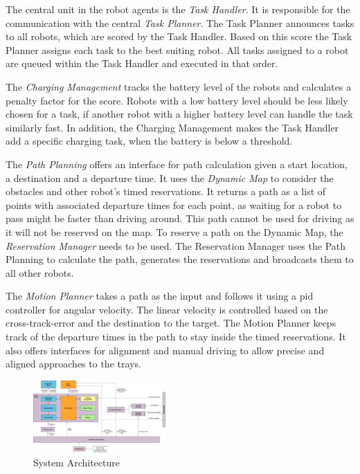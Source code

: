 \documentclass[journal]{IEEEtran}
\begin{document}
The central unit in the robot agents is the \emph{Task Handler}. It is responsible for the communication with the central \emph{Task Planner}. The Task Planner announces tasks to all robots, which are scored by the Task Handler. Based on this score the Task Planner assigns each task to the best suiting robot. All tasks assigned to a robot are queued within the Task Handler and executed in that order.

The \emph{Charging Management} tracks the battery level of the robots and calculates a penalty factor for the score. Robots with a low battery level should be less likely chosen for a task, if another robot with a higher battery level can handle the task similarly fast. In addition, the Charging Management makes the Task Handler add a specific charging task, when the battery is below a threshold.

The \emph{Path Planning} offers an interface for path calculation given a start location, a destination and a departure time. It uses the \emph{Dynamic Map} to consider the obstacles and other robot's timed reservations. It returns a path as a list of points with associated departure times for each point, as waiting for a robot to pass might be faster than driving around. This path cannot be used for driving as it will not be reserved on the map. To reserve a path on the Dynamic Map, the \emph{Reservation Manager} needs to be used. The Reservation Manager uses the Path Planning to calculate the path, generates the reservations and broadcasts them to all other robots.

The \emph{Motion Planner} takes a path as the input and follows it using a pid controller for angular velocity. The linear velocity is controlled based on the cross-track-error and the destination to the target. The Motion Planner keeps track of the departure times in the path to stay inside the timed reservations. It also offers interfaces for alignment and manual driving to allow precise and aligned approaches to the trays.

\begin{figure}[h]
	\centering
	\includegraphics[width=0.45\textwidth]{resources/system_architecture}
	\caption{System Architecture}
	\label{fig:system_architecture}
\end{figure}
\end{document}
